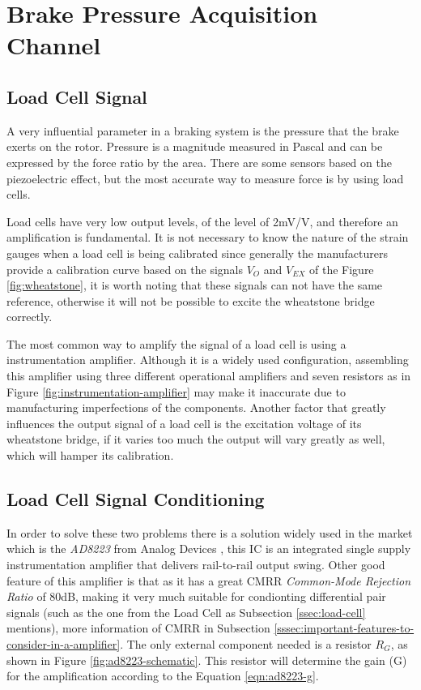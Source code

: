 \section{Brake Pressure Acquisition Channel}\label{sec:brake-pressure-acquisition-channel}

\subsection{Load Cell Signal}\label{ssec:load-cell-signal}

	A very influential parameter in a braking system is the pressure that the brake exerts on the rotor. Pressure is a magnitude measured in Pascal and can be expressed by the force ratio by the area. There are some sensors based on the piezoelectric effect, but the most accurate way to measure force is by using load cells.
	\par
	Load cells have very low output levels, of the level of 2mV/V, and therefore an amplification is fundamental. It is not necessary to know the nature of the strain gauges when a load cell is being calibrated since generally the manufacturers provide a calibration curve based on the signals $V_{O}$ and $V_{EX}$ of the Figure \ref{fig:wheatstone}, it is worth noting that these signals can not have the same reference, otherwise it will not be possible to excite the wheatstone bridge correctly.
	\par
	The most common way to amplify the signal of a load cell is using a instrumentation amplifier. Although it is a widely used configuration, assembling this amplifier using three different operational amplifiers and seven resistors as in Figure \ref{fig:instrumentation-amplifier} may make it inaccurate due to manufacturing imperfections of the components. Another factor that greatly influences the output signal of a load cell is the excitation voltage of its wheatstone bridge, if it varies too much the output will vary greatly as well, which will hamper its calibration.

\subsection{Load Cell Signal Conditioning}\label{ssec:load-cell-signal-conditioning}
		
	In order to solve these two problems there is a solution widely used in the market which is the \textit{AD8223} from Analog Devices \cite{ad8223-datasheet}, this IC is an integrated single supply instrumentation amplifier that delivers rail-to-rail output swing. Other good feature of this amplifier is that as it has a great CMRR \textit{Common-Mode Rejection Ratio} of 80dB, making it very much suitable for condionting differential pair signals (such as the one from the Load Cell as Subsection \ref{ssec:load-cell} mentions), more information of CMRR in Subsection \ref{sssec:important-features-to-consider-in-a-amplifier}. The only external component needed is a resistor $R_{G}$, as shown in Figure \ref{fig:ad8223-schematic}. This resistor will determine the gain (G) for the amplification according to the Equation \ref{eqn:ad8223-g}.
	

